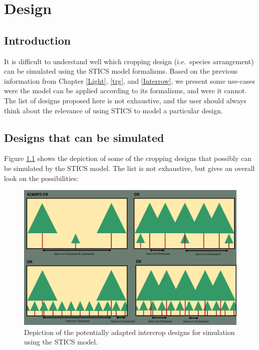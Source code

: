 \documentclass[
]{book}
\begin{document}
\hypertarget{design}{%
\chapter{Design}\label{design}}

\hypertarget{introduction-4}{%
\section{Introduction}\label{introduction-4}}

It is difficult to understand well which cropping design (i.e.~species arrangement) can be simulated using the STICS model formalisms. Based on the previous information from Chapter \ref{Light}, \ref{trg}, and \ref{Interrow}, we present some use-cases were the model can be applied according to its formalisms, and were it cannot.
The list of designs proposed here is not exhaustive, and the user should always think about the relevance of using STICS to model a particular design.

\hypertarget{designs-that-can-be-simulated}{%
\section{Designs that can be simulated}\label{designs-that-can-be-simulated}}

Figure \ref{fig:DesignOK} shows the depiction of some of the cropping designs that possibly can be simulated by the STICS model. The list is not exhaustive, but gives an overall look on the possibilities:

\begin{figure}
\centering
\includegraphics{img/Design_OK.png}
\caption{\label{fig:DesignOK}Depiction of the potentially adapted intercrop designs for simulation using the STICS model.}
\end{figure}
\end{document}
